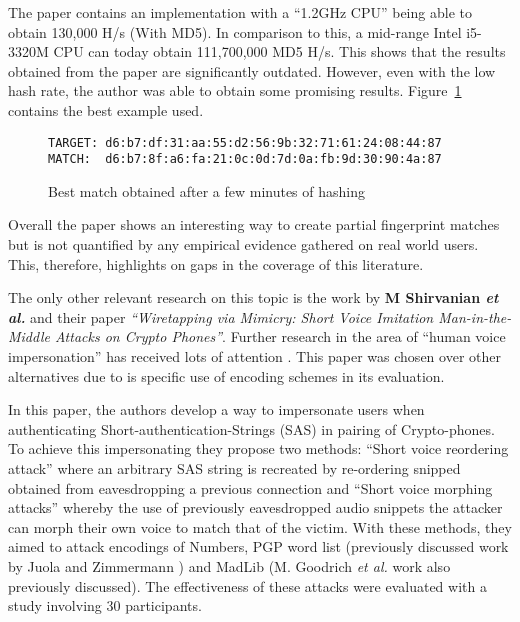The paper contains an implementation with a ``1.2GHz CPU'' being able to obtain 130,000 H/s (With MD5). In comparison to this, a mid-range Intel i5-3320M CPU can today obtain 111,700,000 MD5 H/s. This shows that the results obtained from the paper are significantly outdated. However, even with the low hash rate, the author was able to obtain some promising results. Figure~\ref{ref:fuzz} contains the best example used.

\begin{figure}[!h]
    \begin{center}
        \verb|TARGET: d6:b7:df:31:aa:55:d2:56:9b:32:71:61:24:08:44:87|
        \verb|MATCH:  d6:b7:8f:a6:fa:21:0c:0d:7d:0a:fb:9d:30:90:4a:87|
    \end{center}
    \caption{Best match obtained after a few minutes of hashing}
    \label{ref:fuzz}
\end{figure}

Overall the paper shows an interesting way to create partial fingerprint matches but is not quantified by any empirical evidence gathered on real world users. This, therefore, highlights on gaps in the coverage of this literature.

The only other relevant research on this topic is the work by \textbf{M Shirvanian \textit{et al.}}\cite{shirvanian2014wiretapping} 
and their paper \textit{``Wiretapping via Mimicry: Short 
Voice Imitation Man-in-the-Middle Attacks on Crypto 
Phones''}. Further research in the area of ``human voice impersonation'' has received lots of attention \cite{mukhopadhyay2015all}\cite{chen2017you}\cite{wu2015spoofing}. This paper was chosen over other alternatives due to is specific use of encoding schemes in its evaluation.

In this paper, the authors develop a way to 
impersonate users when authenticating 
Short-authentication-Strings (SAS) in pairing of 
Crypto-phones. To achieve this impersonating they propose 
two methods: ``Short voice reordering attack'' where an 
arbitrary SAS string is recreated by re-ordering snipped 
obtained from eavesdropping a previous connection
and ``Short voice morphing attacks'' whereby the use of 
previously eavesdropped audio snippets the attacker can
morph their own voice to match that of the victim. With 
these methods, they aimed to attack encodings of Numbers, 
PGP word list (previously discussed work by Juola and 
Zimmermann \cite{juola1996whole}) and MadLib (M. Goodrich 
\textit{et al.}\cite{goodrich2006loud} work also 
previously discussed). The effectiveness of these attacks 
were evaluated with a study involving 30 participants.

